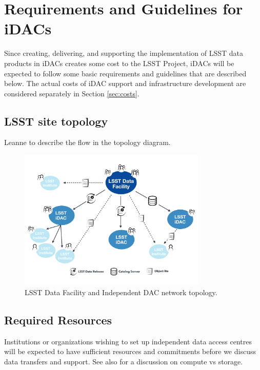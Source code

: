 
\section{Requirements and Guidelines for iDACs}\label{sec:reqs}
Since creating, delivering, and supporting the implementation of LSST data products in iDACs creates some cost to the LSST Project, iDACs will be expected to follow some basic requirements and guidelines that are described below.
The actual costs of iDAC support and infrastructure development are considered separately in Section \ref{sec:costs}.



\subsection{LSST site topology} \label{sec:topology}

{\color{red}Leanne to describe the flow in the topology diagram.} \newline

\begin{figure}
\begin{center}
\includegraphics[width=0.8\textwidth]{images_local/LSST-site-topology}
\caption{LSST Data Facility and Independent DAC network topology.  \label{fig:lsst-site-topology}}
\end{center}
\end{figure}



\subsection{Required Resources} \label{sec:resources}
Institutions or organizations wishing to set up independent data access centres will be expected to have
sufficient resources and commitments before we discuss data transfers and support.
See also  for a discussion on compute vs storage.

